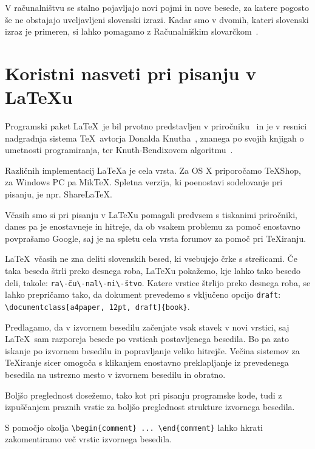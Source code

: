 \documentclass[a4paper, 12pt]{book}
\begin{document}
V računalništvu se stalno pojavljajo novi pojmi in nove besede, za katere pogosto še ne obstajajo uveljavljeni slovenski izrazi.
Kadar smo v dvomih, kateri slovenski izraz je primeren, si lahko pomagamo z Računalniškim slovarčkom~\cite{slovarcek}.





\chapter{Koristni nasveti pri pisanju v \LaTeX{u}}   %
\label{latex}

Programski paket \LaTeX\ je bil prvotno predstavljen v priročniku~\cite{lamport} in je v resnici nadgradnja sistema \TeX\ avtorja Donalda Knutha~\cite{knuth}, 
znanega po svojih knjigah o umetnosti programiranja, 
ter Knuth-Bendixovem algoritmu~\cite{knuth1983simple}.

Različnih implementacij \LaTeX{}a je cela vrsta.
Za OS X priporočamo TeXShop, za Windows PC pa MikTeX. Spletna verzija, ki poenostavi sodelovanje pri pisanju, je npr. ShareLaTeX.

Včasih smo si pri pisanju v \LaTeX{}u  pomagali predvsem s tiskanimi pri\-ro\-čni\-ki, danes pa je enostavneje in hitreje, da ob vsakem problemu za pomoč enostavno povprašamo Google, 
saj je na spletu cela vrsta forumov za pomoč pri \TeX{}iranju.

\LaTeX\ včasih ne zna deliti slovenskih besed, ki vsebujejo črke s strešicami. 
Če taka beseda štrli preko desnega roba,  \LaTeX{}u pokažemo, kje lahko tako besedo deli, takole: \verb=ra\-ču\-nal\-ni\-štvo=.
Katere vrstice štrlijo preko desnega roba, se lahko prepričamo tako, da dokument prevedemo s vključeno opcijo \texttt{draft}: \verb=\documentclass[a4paper, 12pt, draft]{book}=.


Predlagamo, da v izvornem besedilu začenjate vsak stavek v novi vrstici, saj \LaTeX\ sam razporeja besede po vrsticah postavljenega besedila. 
Bo pa zato iskanje po izvornem besedilu in popravljanje veliko hitrejše. 
Večina sistemov za \TeX{}iranje sicer omogoča s klikanjem enostavno preklapljanje  iz prevedenega besedila na ustrezno mesto v izvornem besedilu in obratno.

Boljšo preglednost dosežemo, tako kot pri pisanju programske kode, tudi z izpuščanjem praznih vrstic za boljšo preglednost strukture izvornega besedila.

S pomočjo  okolja \verb=\begin{comment} ... \end{comment}= lahko  hkrati zakomentiramo več vrstic izvornega besedila.
\end{document}
